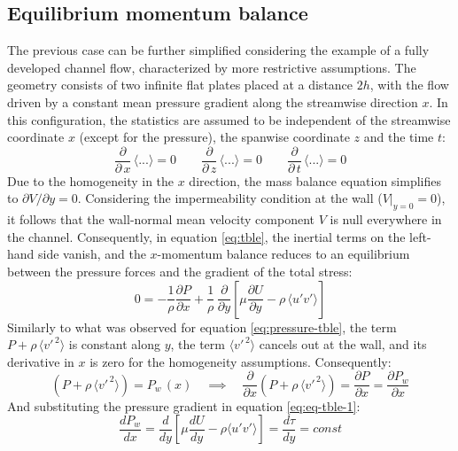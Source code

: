 \documentclass[12pt, a4paper, twoside, openright]{book}
\begin{document}
\subsection{Equilibrium momentum balance}
\label{sec:equilibrium-momentum-balance}
The previous case can be further simplified considering the example of a fully developed channel flow, characterized by more restrictive assumptions. The geometry consists of two infinite flat plates placed at a distance $2h$, with the flow driven by a constant mean pressure gradient along the streamwise direction $x$. In this configuration, the statistics are assumed to be independent of the streamwise coordinate $x$ (except for the pressure), the spanwise coordinate $z$ and the time $t$:
\begin{equation}
	\frac{\partial}{\partial \, x} \, \langle ... \rangle = 0 \qquad \frac{\partial}{\partial \, z} \, \langle ... \rangle = 0 \qquad
	\frac{\partial}{\partial \, t} \, \langle ... \rangle = 0
\end{equation}
Due to the homogeneity in the $x$ direction, the mass balance equation simplifies to $\partial V / \partial y = 0$. Considering the impermeability condition at the wall ($V|_{y=0} = 0$), it follows that the wall-normal mean velocity component $V$ is null everywhere in the channel.
Consequently, in equation \eqref{eq:tble}, the inertial terms on the left-hand side vanish, and the $x$-momentum balance reduces to an equilibrium between the pressure forces and the gradient of the total stress:
\begin{equation}
	0 = -\frac{1}{\rho} \frac{\partial P}{\partial x} + \frac{1}{\rho} \, \frac{\partial}{\partial y} \left[ \mu \frac{\partial U}{\partial y} - \rho \, \langle u'v' \rangle \right]
	\label{eq:eq-tble-1}
\end{equation}
Similarly to what was observed for equation \eqref{eq:pressure-tble}, the term $P + \rho \, \langle v'^{\, 2} \rangle$ is constant along $y$, the term $\langle v'^{\, 2} \rangle$ cancels out at the wall, and its derivative in $x$ is zero for the homogeneity assumptions. Consequently:
\begin{equation}
	\left(
	P + \rho \, \langle v'^{\, 2} \rangle \right) = P_w \, (x)
	\quad
	\implies
	\quad
	\frac{\partial}{\partial x} \left(
	P + \rho \, \langle v'^{\, 2} \rangle \right) = \frac{\partial P}{\partial x} = \frac{\partial P_w}{\partial x}
\end{equation}
And substituting the pressure gradient in equation \eqref{eq:eq-tble-1}:
\begin{equation}
	\frac{d P_w}{dx} = \frac{d}{dy} \left[ \mu \frac{dU}{dy} - \rho \langle u'v' \rangle \right] = \frac{d \tau}{dy} = \textit{const}
	\label{eq:eq-tble-2}
\end{equation}
\end{document}
